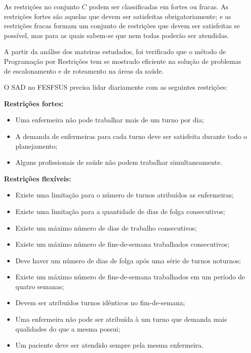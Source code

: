 

As restrições no conjunto $C$ podem ser classificadas em fortes ou fracas. As restrições fortes são aquelas que devem ser satisfeitas obrigatoriamente; e as restrições fracas formam um conjunto de restrições que devem ser satisfeitas se possível, mas para as quais sabem-se que nem todas poderão ser atendidas.

A partir da análise dos mateiras estudados, foi verificado que o método de Programação por Restrições tem se mostrado eficiente na solução de problemas de escalonamento e de roteamento na áreas da saúde. 

O \ac{SAD} no \ac{FESFSUS} precisa lidar diariamente com as seguintes restrições:

\textbf{Restrições fortes:}
\begin{itemize}
\item Uma enfermeira não pode trabalhar mais de um turno por dia;
\item A demanda de enfermeiras para cada turno deve ser satisfeita durante todo o planejamento;
\item Alguns profissionais de saúde não podem trabalhar simultaneamente.
\end{itemize}
 
\textbf{Restrições flexíveis:}
\begin{itemize}
\item Existe uma limitação para o número de turnos atribuídos as enfermeiras; 
\item Existe uma limitação para a quantidade de dias de folga consecutivos; 
\item Existe um máximo número de dias de trabalho consecutivos;
\item Existe um máximo número de fins-de-semana trabalhados consecutivos;
\item Deve haver um número de dias de folga após uma série de turnos noturnos;
\item Existe um máximo número de fins-de-semana trabalhados em um período de quatro semanas; 
\item Devem ser atribuídos turnos idênticos no fim-de-semana;
\item Uma enfermeira não pode ser atribuída à um turno que demanda mais qualidades do que a mesma possui;
\item Um paciente deve ser atendido sempre pela mesma enfermeira.
\end{itemize}


